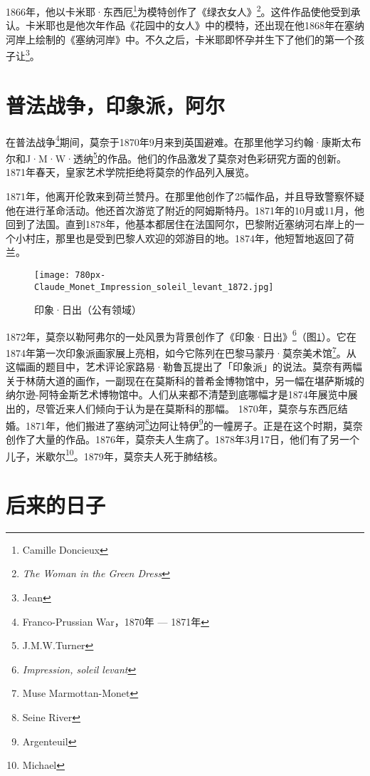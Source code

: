         1866年，他以卡米耶·东西厄\footnote{Camille Doncieux}为模特创作了《绿衣女人》\footnote{\textit{The Woman in the Green Dress}}。这件作品使他受到承认。卡米耶也是他次年作品《花园中的女人》中的模特，还出现在他1868年在塞纳河岸上绘制的《塞纳河岸》中。不久之后，卡米耶即怀孕并生下了他们的第一个孩子让\footnote{Jean}。

    \section{普法战争，印象派，阿尔}

        在普法战争\footnote{Franco-Prussian War，1870年 --- 1871年}期间，莫奈于1870年9月来到英国避难。在那里他学习约翰·康斯太布尔和J·M·W·透纳\footnote{J.M.W.Turner}的作品。他们的作品激发了莫奈对色彩研究方面的创新。1871年春天，皇家艺术学院拒绝将莫奈的作品列入展览。

        1871年，他离开伦敦来到荷兰赞丹。在那里他创作了25幅作品，并且导致警察怀疑他在进行革命活动。他还首次游览了附近的阿姆斯特丹。1871年的10月或11月，他回到了法国。直到1878年，他基本都居住在法国阿尔，巴黎附近塞纳河右岸上的一个小村庄，那里也是受到巴黎人欢迎的郊游目的地。1874年，他短暂地返回了荷兰。

        \begin{figure}[h!]
          \centering
          \texttt{[image: 780px-Claude\_Monet\_Impression\_soleil\_levant\_1872.jpg]}
          \caption{印象·日出（公有领域）}
          \label{fig:impression-soleil-levant}
        \end{figure}
        
        1872年，莫奈以勒阿弗尔的一处风景为背景创作了《印象·日出》\footnote{\textit{Impression, soleil levant}}（图\ref{fig:impression-soleil-levant}）。它在1874年第一次印象派画家展上亮相，如今它陈列在巴黎马蒙丹·莫奈美术馆\footnote{Muse Marmottan-Monet}。从这幅画的题目中，艺术评论家路易·勒鲁瓦提出了「印象派」的说法。莫奈有两幅关于林荫大道的画作，一副现在在莫斯科的普希金博物馆中，另一幅在堪萨斯城的纳尔逊-阿特金斯艺术博物馆中。人们从来都不清楚到底哪幅才是1874年展览中展出的，尽管近来人们倾向于认为是在莫斯科的那幅。
        1870年，莫奈与东西厄结婚。1871年，他们搬进了塞纳河\footnote{Seine River}边阿让特伊\footnote{Argenteuil}的一幢房子。正是在这个时期，莫奈创作了大量的作品。1876年，莫奈夫人生病了。1878年3月17日，他们有了另一个儿子，米歇尔\footnote{Michael}。1879年，莫奈夫人死于肺结核。

    \section{后来的日子}
        
